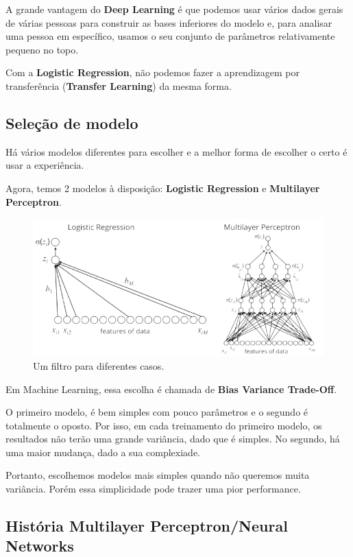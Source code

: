 \documentclass[11pt, a4paper]{article}
\begin{document}
A grande vantagem do \textbf{Deep Learning} é que podemos usar vários dados gerais de várias pessoas para construir as bases inferiores do modelo e, para analisar uma pessoa em específico, usamos o seu conjunto de parâmetros relativamente pequeno no topo.

Com a \textbf{Logistic Regression}, não podemos fazer a aprendizagem por transferência (\textbf{Transfer Learning}) da mesma forma.

\subsection{Seleção de modelo}

Há vários modelos diferentes para escolher e a melhor forma de escolher o certo é usar a experiência.

Agora, temos 2 modelos à disposição: \textbf{Logistic Regression} e \textbf{Multilayer Perceptron}.

\begin{figure}[h]
\centering
\includegraphics[scale=0.4]{12thMTP}
\caption{Um filtro para diferentes casos.}
\end{figure}

Em Machine Learning, essa escolha é chamada de \textbf{Bias Variance Trade-Off}.

O primeiro modelo, é bem simples com pouco parâmetros e o segundo é totalmente o oposto. Por isso, em cada treinamento do primeiro modelo, os resultados não terão uma grande variância, dado que é simples. No segundo, há uma maior mudança, dado a sua complexiade.

Portanto, escolhemos modelos mais simples quando não queremos muita variância. Porém essa simplicidade pode trazer uma pior performance.

\subsection{História Multilayer Perceptron/Neural Networks}
\end{document}
